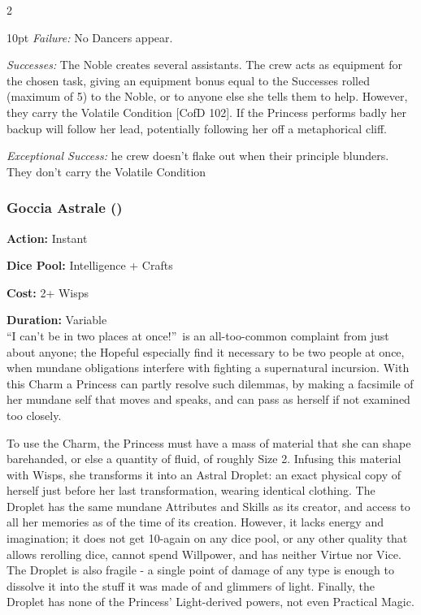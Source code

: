 \begin{multicols}{2}
\begin{myindentpar}{10pt}
    \emph{Failure:} No Dancers appear.

    \emph{Successes:} The Noble creates several assistants. The crew acts as equipment for the chosen task, giving an equipment bonus equal to the Successes rolled (maximum of 5) to the Noble, or to anyone else she tells them to help. However, they carry the Volatile Condition [CofD 102]. If the Princess performs badly her backup will follow her lead, potentially following her off a metaphorical cliff. 

    \emph{Exceptional Success:} he crew doesn’t flake out when their principle blunders. They don’t carry the Volatile Condition \end{myindentpar}

\subsubsection*{Goccia Astrale (\textbullet\textbullet\textbullet)}
\noindent \textbf{Action:} Instant

\noindent \textbf{Dice Pool:} Intelligence + Crafts 

\noindent \textbf{Cost:} 2+ Wisps

\noindent \textbf{Duration:} Variable\\ 

\noindent \textquotedblleft I can't be in two places at once!\textquotedblright\, is an all-too-common complaint from just about anyone; the Hopeful especially find it necessary to be two people at once, when mundane obligations interfere with fighting a supernatural incursion. With this Charm a Princess can partly resolve such dilemmas, by making a facsimile of her mundane self that moves and speaks, and can pass as herself if not examined too closely.

To use the Charm, the Princess must have a mass of material that she can shape barehanded, or else a quantity of fluid, of roughly Size 2. Infusing this material with Wisps, she transforms it into an Astral Droplet: an exact physical copy of herself just before her last transformation, wearing identical clothing. The Droplet has the same mundane Attributes and Skills as its creator, and access to all her memories as of the time of its creation. However, it lacks energy and imagination; it does not get 10-again on any dice pool, or any other quality that allows rerolling dice, cannot spend Willpower, and has neither Virtue nor Vice. The Droplet is also fragile - a single point of damage of any type is enough to dissolve it into the stuff it was made of and glimmers of light. Finally, the Droplet has none of the Princess' Light-derived powers, not even Practical Magic.


\end{multicols}
